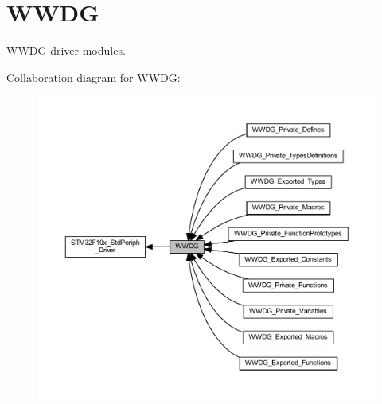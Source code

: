 \hypertarget{group___w_w_d_g}{}\section{W\+W\+DG}
\label{group___w_w_d_g}


W\+W\+DG driver modules.  


Collaboration diagram for W\+W\+DG\+:
\nopagebreak
\begin{figure}[H]
\begin{center}
\leavevmode
\includegraphics[width=350pt]{group___w_w_d_g}
\end{center}
\end{figure}
